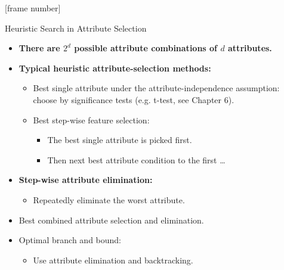 \documentclass[aspectratio=169,t]{beamer}
\begin{document}
  {
    [frame number]
    \begin{frame}{Heuristic Search in Attribute Selection}
    \begin{itemize}
      \item \textbf{There are $2^d$ possible attribute combinations of $d$ attributes.}
      \item\textbf{\color{airforceblue}Typical heuristic attribute-selection methods:}
      \begin{itemize}
        \item Best single attribute under the attribute-independence assumption: \\ choose by significance tests (e.g. t-test, see Chapter 6).
        \item Best step-wise feature selection:
        \begin{itemize}
          \item The best single attribute is picked first.
          \item Then next best attribute condition to the first \ldots
        \end{itemize}
      \end{itemize}
      \item \textbf{\color{airforceblue}Step-wise attribute elimination:}
      \begin{itemize}
        \item Repeatedly eliminate the worst attribute.
      \end{itemize}
      \item Best combined attribute selection and elimination.
      \item Optimal branch and bound:
      \begin{itemize}
        \item Use attribute elimination and backtracking.
      \end{itemize}
    \end{itemize}
    \end{frame}
  }
\end{document}
